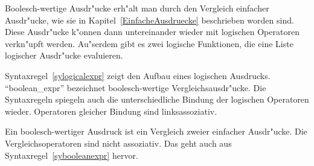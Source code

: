 Boolesch-wertige Ausdr"ucke erh"alt man durch den Vergleich einfacher
Ausdr"ucke, wie sie in Kapitel~\ref{EinfacheAusdruecke} beschrieben
worden sind. Diese Ausdr"ucke k"onnen dann untereinander wieder mit
logischen Operatoren verkn"upft werden. Au"serdem gibt es zwei
logische Funktionen, die eine Liste logischer Ausdr"ucke evaluieren.

Syntaxregel~\ref{sylogicalexpr} zeigt den Aufbau eines logischen
Ausdrucks. ``boolean\_expr'' bezeichnet boolesch-wertige
Vergleichsausdr"ucke. Die Syntaxregeln spiegeln auch die
unterschiedliche Bindung der logischen Operatoren wieder. Operatoren
gleicher Bindung sind linksassoziativ.

\begin{center}
\end{center}

Ein boolesch-wertiger Ausdruck ist ein Vergleich zweier einfacher
Ausdr"ucke. Die Vergleichsoperatoren sind nicht assoziativ. Das geht
auch aus Syntaxregel~\ref{sybooleanexpr} hervor.


